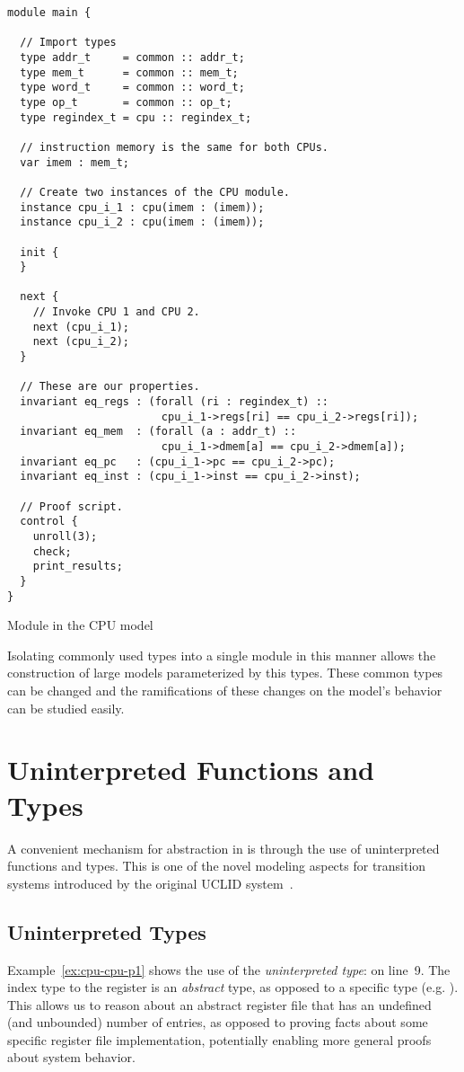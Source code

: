 \begin{uclidlisting}[htbp]
\begin{lstlisting}[language=uclid,style=uclidstyle]
module main {

  // Import types
  type addr_t     = common :: addr_t;
  type mem_t      = common :: mem_t;
  type word_t     = common :: word_t;
  type op_t       = common :: op_t;
  type regindex_t = cpu :: regindex_t;
  
  // instruction memory is the same for both CPUs.
  var imem : mem_t;

  // Create two instances of the CPU module.
  instance cpu_i_1 : cpu(imem : (imem));
  instance cpu_i_2 : cpu(imem : (imem));

  init {
  }

  next {
    // Invoke CPU 1 and CPU 2.
    next (cpu_i_1);
    next (cpu_i_2);
  }
  
  // These are our properties.
  invariant eq_regs : (forall (ri : regindex_t) :: 
                        cpu_i_1->regs[ri] == cpu_i_2->regs[ri]);
  invariant eq_mem  : (forall (a : addr_t) :: 
                        cpu_i_1->dmem[a] == cpu_i_2->dmem[a]);
  invariant eq_pc   : (cpu_i_1->pc == cpu_i_2->pc);
  invariant eq_inst : (cpu_i_1->inst == cpu_i_2->inst);

  // Proof script.
  control {
    unroll(3);
    check;
    print_results;
  }
}
\end{lstlisting}
\caption{Module  in the CPU model}
\label{ex:cpu-main}
\end{uclidlisting}


Isolating commonly used types into a single module in this manner allows the construction of large models parameterized by this types. These common types can be changed and the ramifications of these changes on the model's behavior can be studied easily.

\section{Uninterpreted Functions and Types}
A convenient mechanism for abstraction in \uclid{} is through the use of uninterpreted functions and types. This is one of the novel modeling
aspects for transition systems introduced by the original UCLID system~\cite{bryant-cav02}.

\subsection{Uninterpreted Types}
Example~\ref{ex:cpu-cpu-p1} shows the use of the \emph{uninterpreted type}:  on line~9. The index type to the register is an \emph{abstract} type, as opposed to a specific type (e.g. ). This allows us to reason about an abstract register file that has an undefined (and unbounded) number of entries, as opposed to proving facts about some specific register file implementation, potentially enabling more general proofs about system behavior.

